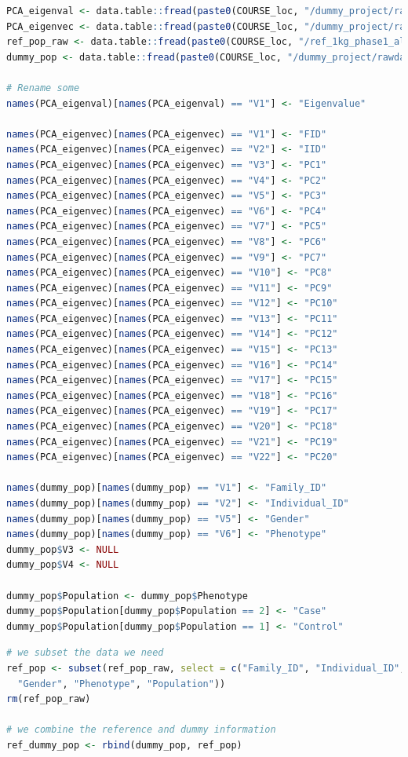 \documentclass[
]{book}
\begin{document}
\begin{lstlisting}[language=R]
PCA_eigenval <- data.table::fread(paste0(COURSE_loc, "/dummy_project/rawdata.1kg_phase1.clean.eigenval"))
PCA_eigenvec <- data.table::fread(paste0(COURSE_loc, "/dummy_project/rawdata.1kg_phase1.clean.eigenvec"))
ref_pop_raw <- data.table::fread(paste0(COURSE_loc, "/ref_1kg_phase1_all/1kg_phase1_all.pheno"))
dummy_pop <- data.table::fread(paste0(COURSE_loc, "/dummy_project/rawdata.fam"))

# Rename some
names(PCA_eigenval)[names(PCA_eigenval) == "V1"] <- "Eigenvalue"

names(PCA_eigenvec)[names(PCA_eigenvec) == "V1"] <- "FID"
names(PCA_eigenvec)[names(PCA_eigenvec) == "V2"] <- "IID"
names(PCA_eigenvec)[names(PCA_eigenvec) == "V3"] <- "PC1"
names(PCA_eigenvec)[names(PCA_eigenvec) == "V4"] <- "PC2"
names(PCA_eigenvec)[names(PCA_eigenvec) == "V5"] <- "PC3"
names(PCA_eigenvec)[names(PCA_eigenvec) == "V6"] <- "PC4"
names(PCA_eigenvec)[names(PCA_eigenvec) == "V7"] <- "PC5"
names(PCA_eigenvec)[names(PCA_eigenvec) == "V8"] <- "PC6"
names(PCA_eigenvec)[names(PCA_eigenvec) == "V9"] <- "PC7"
names(PCA_eigenvec)[names(PCA_eigenvec) == "V10"] <- "PC8"
names(PCA_eigenvec)[names(PCA_eigenvec) == "V11"] <- "PC9"
names(PCA_eigenvec)[names(PCA_eigenvec) == "V12"] <- "PC10"
names(PCA_eigenvec)[names(PCA_eigenvec) == "V13"] <- "PC11"
names(PCA_eigenvec)[names(PCA_eigenvec) == "V14"] <- "PC12"
names(PCA_eigenvec)[names(PCA_eigenvec) == "V15"] <- "PC13"
names(PCA_eigenvec)[names(PCA_eigenvec) == "V16"] <- "PC14"
names(PCA_eigenvec)[names(PCA_eigenvec) == "V17"] <- "PC15"
names(PCA_eigenvec)[names(PCA_eigenvec) == "V18"] <- "PC16"
names(PCA_eigenvec)[names(PCA_eigenvec) == "V19"] <- "PC17"
names(PCA_eigenvec)[names(PCA_eigenvec) == "V20"] <- "PC18"
names(PCA_eigenvec)[names(PCA_eigenvec) == "V21"] <- "PC19"
names(PCA_eigenvec)[names(PCA_eigenvec) == "V22"] <- "PC20"

names(dummy_pop)[names(dummy_pop) == "V1"] <- "Family_ID"
names(dummy_pop)[names(dummy_pop) == "V2"] <- "Individual_ID"
names(dummy_pop)[names(dummy_pop) == "V5"] <- "Gender"
names(dummy_pop)[names(dummy_pop) == "V6"] <- "Phenotype"
dummy_pop$V3 <- NULL
dummy_pop$V4 <- NULL

dummy_pop$Population <- dummy_pop$Phenotype
dummy_pop$Population[dummy_pop$Population == 2] <- "Case"
dummy_pop$Population[dummy_pop$Population == 1] <- "Control"
\end{lstlisting}

\begin{lstlisting}[language=R]
# we subset the data we need
ref_pop <- subset(ref_pop_raw, select = c("Family_ID", "Individual_ID",
  "Gender", "Phenotype", "Population"))
rm(ref_pop_raw)

# we combine the reference and dummy information
ref_dummy_pop <- rbind(dummy_pop, ref_pop)
\end{lstlisting}
\end{document}
